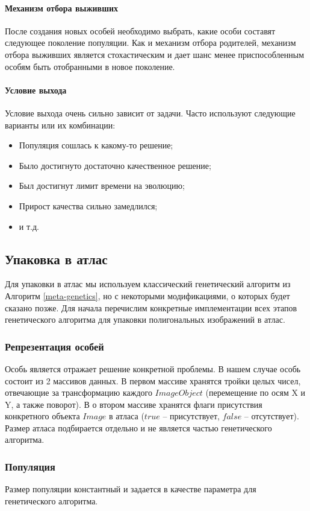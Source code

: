 \documentclass{fefu_thesis/cls/fefu}
\newcommand*\talgref[1]{Алгоритм \ref{#1}}
\begin{document}
    \paragraph{Механизм отбора выживших}
    После создания новых особей необходимо выбрать, какие особи составят следующее поколение популяции. Как и механизм отбора родителей, механизм отбора выживших является стохастическим и дает шанс менее приспособленным особям быть отобранными в новое поколение.
    \paragraph{Условие выхода}
    Условие выхода очень сильно зависит от задачи. Часто используют следующие варианты или их комбинации:
    \begin{itemize}
        \item Популяция сошлась к какому-то решение;
        \item Было достигнуто достаточно качественное решение;
        \item Был достигнут лимит времени на эволюцию;
        \item Прирост качества сильно замедлился;
        \item и т.д.
    \end{itemize}

    \subsection{Упаковка в атлас}
    Для упаковки в атлас мы используем классический генетический алгоритм из \talgref{meta-genetics}, но с некоторыми модификациями, о которых будет сказано позже. Для начала перечислим конкретные имплементации всех этапов генетического алгоритма для упаковки полигональных изображений в атлас.
    \subsubsection{Репрезентация особей}
    Особь является отражает решение конкретной проблемы. В нашем случае особь состоит из 2 массивов данных. В первом массиве хранятся тройки целых чисел, отвечающие за трансформацию каждого $ImageObject$ (перемещение по осям X и Y, а также поворот). В о втором массиве хранятся флаги присутствия конкретного объекта $Image$ в атласа ($true$ -- присутствует, $false$ -- отсутствует). Размер атласа подбирается отдельно и не является частью генетического алгоритма.
    \subsubsection{Популяция}
    Размер популяции константный и задается в качестве параметра для генетического алгоритма.
\end{document}
